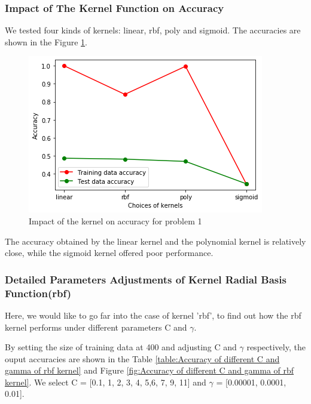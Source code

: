 \subsubsection{Impact of The Kernel Function on Accuracy}
We tested four kinds of kernels: linear, rbf, poly and sigmoid. The accuracies are shown in the Figure \ref{fig:Impact of the kernel on accuracy for problem 1}.
\begin{figure}[h]
    \centering
    \includegraphics[scale=0.6]{figures/Impact of the kernel on accuracy for problem 1.png}
    \caption{Impact of the kernel on accuracy for problem 1}
    \label{fig:Impact of the kernel on accuracy for problem 1}
\end{figure}

The accuracy obtained by the linear kernel and the polynomial kernel is relatively close, while the sigmoid kernel offered poor performance.
\subsubsection{Detailed Parameters Adjustments of Kernel Radial Basis Function(rbf)}
Here, we would like to go far into the case of kernel 'rbf', to find out how the rbf kernel performs under different parameters C and $\gamma$. 


By setting the size of training data at 400 and adjusting C and $\gamma$ respectively, the ouput accuracies are shown in the Table \ref{table:Accuracy of different C and gamma of rbf kernel} and Figure \ref{fig:Accuracy of different C and gamma of rbf kernel}. We select C = [0.1, 1, 2, 3, 4, 5,6, 7, 9, 11] and $\gamma$ = [0.00001, 0.0001, 0.01].

